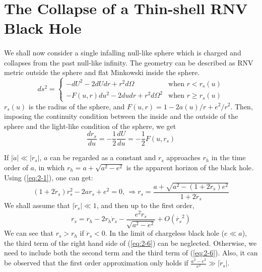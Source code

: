 \documentclass[letterpaper,12pt]{article}
\begin{document}
\section{The Collapse of a Thin-shell RNV Black Hole}\label{sec:2}
\paragraph{ }
We shall now consider a single infalling null-like sphere which is charged and collapses from the past null-like infinity. The geometry can be described as RNV metric outside the sphere and flat Minkowski inside the sphere.
\begin{equation}
ds^2 =\begin{cases}
  -dU^2-2dUdr+r^2d\Omega & \mbox{when } r < r_{s}(u) \\
  -F(u, r)du^2 -2dudr + r^{2}d\Omega^{2}  & \mbox{when } r \geq r_{s}(u)
\end{cases}
\end{equation}
$r_{s}(u)$ is the radius of the sphere, and $F(u, r) = 1-2a(u)/r+e^2/r^2$. Then, imposing the continuity condition between the inside and the outside of the sphere and the light-like condition of the sphere, we get
\begin{equation}\label{eq:2-1}
\frac{dr_{s}}{du} = -\frac{1}{2}\frac{dU}{du} = -\frac{1}{2}F(u,r_{s})
\end{equation}

If $|\dot{a}| \ll |\dot{r}_{s}|$, $a$ can be regarded as a constant and $r_{s}$ approaches $ r_{h}$ in the time order of $a$, in which $r_{h} = a +\sqrt{a^{2}-e^{2}}$ is the apparent horizon of the black hole. Using (\ref{eq:2-1}), one can get:
\begin{equation}\label{eq:2-5}
(1+2\dot{r}_{s})r_{s}^{2}-2ar_{s}+e^{2}=0 \textrm{, }\Rightarrow r_{s} = \frac{a+\sqrt{a^{2}-(1+2\dot{r}_{s})e^{2}}}{1+2\dot{r}_{s}}
\end{equation}
We shall assume that $|\dot{r}_{s}| \ll 1$, and then up to the first order,
\begin{equation}\label{eq:2-6}
r_{s} = r_{h}-2r_{h}\dot{r}_{s}-\frac{e^{2}\dot{r}_{s}}{\sqrt{a^{2}-e^{2}}} +O(\dot{r_{s}}^{2})
\end{equation}
We can see that $r_{s} > r_{h}$ if $ \dot{r}_{s}<0$. In the limit of chargeless black hole ($e \ll a$), the third term of the right hand side of (\ref{eq:2-6}) can be neglected. Otherwise, we need to include both the second term and the third term of (\ref{eq:2-6}). Also, it can be observed that the first order approximation only holds if $\frac{a^2-e^2}{e^2} \gg |\dot{r}_{s}|$.
\end{document}
